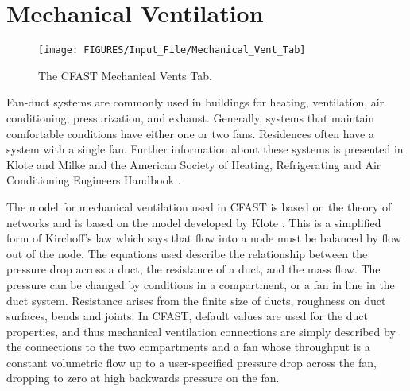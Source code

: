 




\chapter{Mechanical Ventilation}

\begin{figure}[h!]
\begin{center}
\texttt{[image: FIGURES/Input\_File/Mechanical\_Vent\_Tab]}
\caption[The CFAST Mechanical Vents Tab]{The CFAST Mechanical Vents Tab.}
\end{center}
\end{figure}

Fan-duct systems are commonly used in buildings for heating, ventilation, air conditioning, pressurization, and exhaust. Generally, systems that maintain comfortable conditions have either one or two fans.  Residences often have a system with a single fan. Further information about these systems is presented in  Klote and Milke \cite{Klote:2002} and the American Society of Heating, Refrigerating and Air Conditioning Engineers Handbook \cite{ASHRAE:2001}.

The model for mechanical ventilation used in CFAST is based on the theory of networks and is based on the model developed by Klote \cite{Klote:1988a}.  This is a simplified form of Kirchoff's law which says that flow into a node must be balanced by flow out of the node. The equations used describe the relationship between the pressure drop across a duct, the resistance of a duct, and the mass flow.  The pressure can be changed by conditions in a compartment, or a fan in line in the duct system.  Resistance arises from the finite size of ducts, roughness on duct surfaces, bends and joints. In CFAST, default values are used for the duct properties, and thus mechanical ventilation connections are simply described by the connections to the two compartments and a fan whose throughput is a constant volumetric flow up to a user-specified pressure drop across the fan, dropping to zero at high backwards pressure on the fan.

